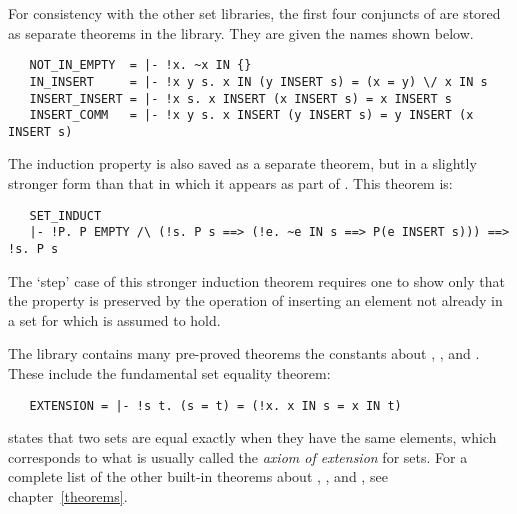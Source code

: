 For consistency with the other set libraries, the first four conjuncts of
 are stored as separate theorems in the 
library.  They are given the names shown below.

\begin{hol} 
\begin{verbatim}
   NOT_IN_EMPTY  = |- !x. ~x IN {}
   IN_INSERT     = |- !x y s. x IN (y INSERT s) = (x = y) \/ x IN s
   INSERT_INSERT = |- !x s. x INSERT (x INSERT s) = x INSERT s
   INSERT_COMM   = |- !x y s. x INSERT (y INSERT s) = y INSERT (x INSERT s)
\end{verbatim}\end{hol}

\noindent The induction property is also saved as a separate
theorem, but in a slightly stronger form than that in which it appears as part
of .  This theorem is:

\begin{hol} 
\begin{verbatim}
   SET_INDUCT 
   |- !P. P EMPTY /\ (!s. P s ==> (!e. ~e IN s ==> P(e INSERT s))) ==> !s. P s
\end{verbatim}\end{hol}

\noindent The `step' case of this stronger induction theorem requires one to
show only that the property  is preserved by the operation of inserting
an element not already in a set  for which  is assumed to
hold.

The  library contains many pre-proved theorems the constants
about , , and . These include the fundamental set
equality theorem:

\begin{hol}
\begin{verbatim}
   EXTENSION = |- !s t. (s = t) = (!x. x IN s = x IN t)
\end{verbatim}\end{hol}

\noindent {} states that two sets are equal exactly when they have
the same elements, which corresponds to what is usually called the {\it axiom
of extension\/} for sets.  For a complete list of the
other built-in theorems about , , and , see
chapter~\ref{theorems}.

